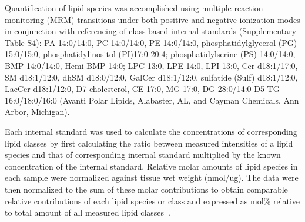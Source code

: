 \documentclass[letterpaper]{article}
\begin{document}
Quantification of lipid species was accomplished using multiple reaction
monitoring (MRM) transitions under both positive and negative ionization
modes in conjunction with referencing of class-based internal standards
(Supplementary Table S4): PA
14:0/14:0, PC 14:0/14:0, PE 14:0/14:0, phosphatidylglycerol (PG) 15:0/15:0,
phosphatidylinositol (PI)17:0-20:4; phosphatidylserine (PS) 14:0/14:0, BMP
14:0/14:0, Hemi BMP 14:0; LPC 13:0,  LPE 14:0, LPI 13:0, Cer d18:1/17:0, SM
d18:1/12:0, dhSM d18:0/12:0, GalCer d18:1/12:0, sulfatide (Sulf) d18:1/12:0,
LacCer d18:1/12:0, D7-cholesterol, CE 17:0, MG 17:0, DG 28:0/14:0 D5-TG
16:0/18:0/16:0 (Avanti Polar Lipids, Alabaster, AL, and Cayman Chemicals,
Ann Arbor, Michigan). 

Each internal standard was used to calculate the concentrations of
corresponding lipid classes by first calculating the ratio between measured
intensities of a lipid species and that of corresponding internal standard
multiplied by the known concentration of the internal standard.  Relative
molar amounts of lipid species in each sample were normalized against tissue
wet weight (nmol/ug).  The data were then normalized to the sum of these molar
contributions to obtain comparable relative contributions of each lipid
species or class and expressed as mol\% relative to total amount of all
measured lipid classes~\citep{Chan2017,Guan2013}.
\end{document}
